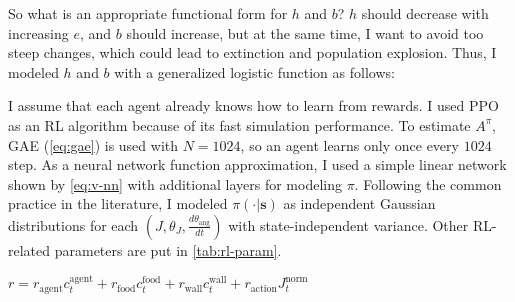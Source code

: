 So what is an appropriate functional form for $h$ and $b$? $h$ should decrease with increasing $e$, and $b$ should increase, but at the same time, I want to avoid too steep changes, which could lead to extinction and population explosion. Thus, I modeled $h$ and $b$ with a generalized logistic function \citep{richardsFlexibleGrowthFunction1959} as follows:

I assume that each agent already knows how to learn from rewards. I used PPO\citep{schulmanProximalPolicyOptimization2017} as an RL algorithm because of its fast simulation performance. To estimate $A^{\pi}$, GAE (\cref{eq:gae}) is used with $N=1024$, so an agent learns only once every $1024$ step. As a neural network function approximation, I used a simple linear network shown by \cref{eq:v-nn} with additional layers for modeling $\pi$. Following the common practice in the literature, I modeled $\pi(\cdot|\textbf{s})$ as independent Gaussian distributions for each $ (J, \theta_{J}, \frac{d\theta_{\textrm{ang}}}{dt}) $ with state-independent variance. Other RL-related parameters are put in \cref{tab:rl-param}.

$r = r_{\textrm{agent}}c_{t}^{\textrm{agent}} + r_{\textrm{food}}c_{t}^{\textrm{food}} + r_{\textrm{wall}}c_{t}^{\textrm{wall}} + r_{\textrm{action}}J_{t}^{\textrm{norm}}$

